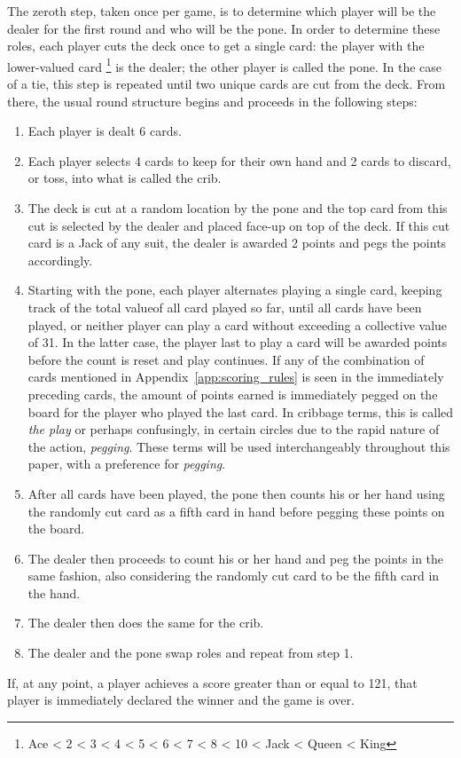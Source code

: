 The zeroth step, taken once per game, is to determine which player will be the
dealer for the first round and who will be the pone.
%
%
In order to determine these roles,
each player cuts the deck once to get a single card:
the player with the lower-valued card%
\footnote{Ace < 2 < 3 < 4 < 5 < 6 < 7 < 8 < 10 < Jack < Queen < King}
is the dealer;
the other player is called the pone.
In the case of a tie, this step is repeated until two unique cards are
cut from the deck.
%
From there, the usual round structure begins and proceeds in the following
steps:
%
\begin{enumerate}
%
\item Each player is dealt 6 cards.
%
\item Each player selects 4 cards to keep for their own hand and 2 cards to
	discard, or toss, into what is called the crib.
%
\item The deck is cut at a random location by the pone
	and the top card from this cut is selected by the dealer and placed
	face-up on top of the deck.
	If this cut card is a Jack of any suit,
	the dealer is awarded 2 points and pegs the points accordingly.
%
\item Starting with the pone, each player alternates playing a single card,
	keeping track of the total value\footnotemark of all card played so far,
	until all cards have been played,
	or neither player can play a card without exceeding a collective value of
	31.
	In the latter case, the player last to play a card will be awarded points
	before the count is reset and play continues.
	If any of the combination of cards mentioned in
	Appendix~\ref{app:scoring_rules} is seen in the immediately preceding cards,
	the amount of points earned is immediately pegged on the board for the
	player who played the last card.
	In cribbage terms, this is called \textit{the play}
	or perhaps confusingly,
	in certain circles due to the rapid nature of the
	action, \textit{pegging}.
	These terms will be used interchangeably throughout this paper,
	with a preference for \textit{pegging}.
%
\item After all cards have been played,
	the pone then counts his or her hand using the randomly cut card as a
	fifth card in hand before pegging these points on the board.
%
\item The dealer then proceeds to count his or her hand and peg the points
	in the same fashion, also considering the randomly cut card to be the
	fifth card in the hand.
%
\item The dealer then does the same for the crib.
%
\item The dealer and the pone swap roles and repeat from step 1.
%
\end{enumerate}
%
If, at any point, a player achieves a score greater than or equal to 121,
that player is immediately declared the winner and the game is over.


